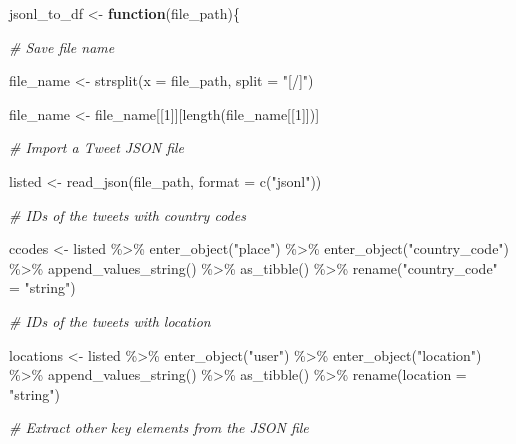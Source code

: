 \documentclass[
]{book}
\newenvironment{Shaded}{\begin{snugshade}}{\end{snugshade}}
\newcommand{\AttributeTok}[1]{\textcolor[rgb]{0.77,0.63,0.00}{#1}}
\newcommand{\CommentTok}[1]{\textcolor[rgb]{0.56,0.35,0.01}{\textit{#1}}}
\newcommand{\ControlFlowTok}[1]{\textcolor[rgb]{0.13,0.29,0.53}{\textbf{#1}}}
\newcommand{\DecValTok}[1]{\textcolor[rgb]{0.00,0.00,0.81}{#1}}
\newcommand{\FunctionTok}[1]{\textcolor[rgb]{0.00,0.00,0.00}{#1}}
\newcommand{\NormalTok}[1]{#1}
\newcommand{\OtherTok}[1]{\textcolor[rgb]{0.56,0.35,0.01}{#1}}
\newcommand{\SpecialCharTok}[1]{\textcolor[rgb]{0.00,0.00,0.00}{#1}}
\newcommand{\StringTok}[1]{\textcolor[rgb]{0.31,0.60,0.02}{#1}}
\begin{document}
\begin{Shaded}
\begin{Highlighting}[]
\NormalTok{jsonl\_to\_df }\OtherTok{\textless{}{-}} \ControlFlowTok{function}\NormalTok{(file\_path)\{}

\CommentTok{\# Save file name }

\NormalTok{file\_name }\OtherTok{\textless{}{-}} \FunctionTok{strsplit}\NormalTok{(}\AttributeTok{x =}\NormalTok{ file\_path, }
                     \AttributeTok{split =} \StringTok{"[/]"}\NormalTok{) }

\NormalTok{file\_name }\OtherTok{\textless{}{-}}\NormalTok{ file\_name[[}\DecValTok{1}\NormalTok{]][}\FunctionTok{length}\NormalTok{(file\_name[[}\DecValTok{1}\NormalTok{]])]}

\CommentTok{\# Import a Tweet JSON file}

\NormalTok{listed }\OtherTok{\textless{}{-}} \FunctionTok{read\_json}\NormalTok{(file\_path, }\AttributeTok{format =} \FunctionTok{c}\NormalTok{(}\StringTok{"jsonl"}\NormalTok{))}

\CommentTok{\# IDs of the tweets with country codes}

\NormalTok{ccodes }\OtherTok{\textless{}{-}}\NormalTok{ listed }\SpecialCharTok{\%\textgreater{}\%}
  \FunctionTok{enter\_object}\NormalTok{(}\StringTok{"place"}\NormalTok{) }\SpecialCharTok{\%\textgreater{}\%}
  \FunctionTok{enter\_object}\NormalTok{(}\StringTok{"country\_code"}\NormalTok{) }\SpecialCharTok{\%\textgreater{}\%}
  \FunctionTok{append\_values\_string}\NormalTok{() }\SpecialCharTok{\%\textgreater{}\%}
  \FunctionTok{as\_tibble}\NormalTok{() }\SpecialCharTok{\%\textgreater{}\%}
  \FunctionTok{rename}\NormalTok{(}\StringTok{"country\_code"} \OtherTok{=} \StringTok{"string"}\NormalTok{)}

\CommentTok{\# IDs of the tweets with location}

\NormalTok{locations }\OtherTok{\textless{}{-}}\NormalTok{ listed }\SpecialCharTok{\%\textgreater{}\%}
  \FunctionTok{enter\_object}\NormalTok{(}\StringTok{"user"}\NormalTok{) }\SpecialCharTok{\%\textgreater{}\%}
  \FunctionTok{enter\_object}\NormalTok{(}\StringTok{"location"}\NormalTok{) }\SpecialCharTok{\%\textgreater{}\%}
  \FunctionTok{append\_values\_string}\NormalTok{() }\SpecialCharTok{\%\textgreater{}\%}
  \FunctionTok{as\_tibble}\NormalTok{() }\SpecialCharTok{\%\textgreater{}\%}
  \FunctionTok{rename}\NormalTok{(}\AttributeTok{location =} \StringTok{"string"}\NormalTok{)}

\CommentTok{\# Extract other key elements from the JSON file}


\end{Highlighting}
\end{Shaded}
\end{document}
